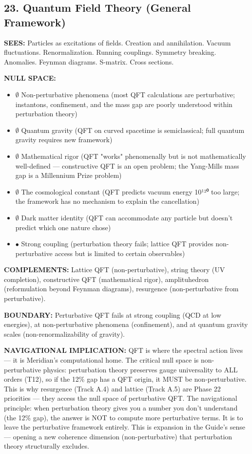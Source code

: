 \bigskip\noindent\makebox[\textwidth]{\color{rulegray}\rule{5cm}{0.3pt}}\bigskip


\subsection*{23. Quantum Field Theory (General Framework)}


\textbf{SEES:} Particles as excitations of fields. Creation and annihilation. Vacuum fluctuations. Renormalization. Running couplings. Symmetry breaking. Anomalies. Feynman diagrams. S-matrix. Cross sections.


\textbf{NULL SPACE:}

\begin{itemize}[nosep,leftmargin=*]
  \item $\emptyset$ Non-perturbative phenomena (most QFT calculations are perturbative; instantons, confinement, and the mass gap are poorly understood within perturbation theory)
  \item $\emptyset$ Quantum gravity (QFT on curved spacetime is semiclassical; full quantum gravity requires new framework)
  \item $\emptyset$ Mathematical rigor (QFT "works" phenomenally but is not mathematically well-defined — constructive QFT is an open problem; the Yang-Mills mass gap is a Millennium Prize problem)
  \item $\emptyset$ The cosmological constant (QFT predicts vacuum energy 10¹²⁰ too large; the framework has no mechanism to explain the cancellation)
  \item $\emptyset$ Dark matter identity (QFT can accommodate any particle but doesn't predict which one nature chose)
  \item $\bullet$ Strong coupling (perturbation theory fails; lattice QFT provides non-perturbative access but is limited to certain observables)
\end{itemize}


\textbf{COMPLEMENTS:} Lattice QFT (non-perturbative), string theory (UV completion), constructive QFT (mathematical rigor), amplituhedron (reformulation beyond Feynman diagrams), resurgence (non-perturbative from perturbative).


\textbf{BOUNDARY:} Perturbative QFT fails at strong coupling (QCD at low energies), at non-perturbative phenomena (confinement), and at quantum gravity scales (non-renormalizability of gravity).


\textbf{NAVIGATIONAL IMPLICATION:} QFT is where the spectral action lives — it is Meridian's computational home. The critical null space is non-perturbative physics: perturbation theory preserves gauge universality to ALL orders (T12), so if the 12\% gap has a QFT origin, it MUST be non-perturbative. This is why resurgence (Track A.4) and lattice (Track A.5) are Phase 22 priorities — they access the null space of perturbative QFT. The navigational principle: when perturbation theory gives you a number you don't understand (the 12\% gap), the answer is NOT to compute more perturbative terms. It is to leave the perturbative framework entirely. This is expansion in the Guide's sense — opening a new coherence dimension (non-perturbative) that perturbation theory structurally excludes.


